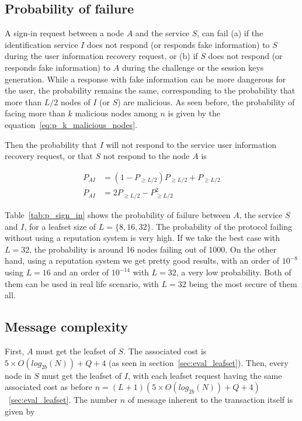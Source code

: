   \subsection{Probability of failure}
    A sign-in request between a node $A$ and the service $S$, can fail (a) if the identification service $I$ does
not respond (or responds fake information) to $S$ during the user information recovery
request, or (b) if $S$ does not respond (or responds fake information) to $A$
during the challenge or the session keys generation. While a response with fake information can be more dangerous for the
user, the probability remains the same, corresponding to the
probability that more than $L/2$ nodes of $I$ (or $S$) are malicious.
    As seen before, the probability of facing more than $k$ malicious nodes among
$n$ is given by the equation~\ref{eq:p_k_malicious_nodes}.

    Then the probability that $I$ will not respond to the service user
information recovery request, or that $S$ not respond to the node $A$ is

    \begin{align}
      P_{AI} &= (1- P_{\ge L/2}) P_{\ge L/2} +  P_{\ge L/2} \\
      P_{AI} &= 2P_{\ge L/2} - P^2_{\ge L/2}
    \end{align}


    Table~\eqref{tab:p_sign_in} shows the probability of failure
between $A$, the service $S$ and $I$, for a leafset size of $L = \{8,16,32\}$.
    The probability of the protocol failing without using a reputation system
is very high. If we take the best case with $L=32$, the probability is around
16 nodes failing out of 1000. On the other hand, using a reputation system we
get pretty good results, with an order of $10^{-8}$ using $L=16$ and an order
of $10^{-14}$ with $L=32$, a very low probability. Both of them can be used
in real life scenario, with $L=32$ being the most secure of them all.

  \subsection{Message complexity}

    First, $A$ must get the leafset of $S$. The associated cost is $5
\times O(log_{2b}(N)) + Q + 4$ (as seen in section~\ref{sec:eval_leafset}).
Then, every node in $S$ must get the leafset of $I$, with each leafset request
having the same associated cost as before $n = (L+1)(5 \times O(log_{2b}(N)) + Q + 4)$~\ref{sec:eval_leafset}.
    The number $n$ of message inherent to the transaction itself is given by

